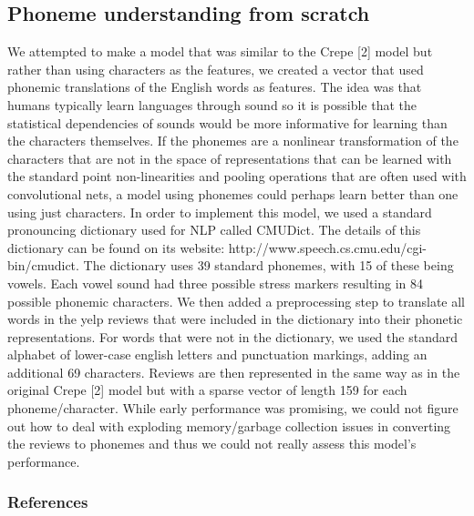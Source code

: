 \documentclass{article} %
\begin{document}
\subsection{Phoneme understanding from scratch}
We attempted to make a model that was similar to the Crepe [2] model but rather than using characters as the features, we created a vector that used phonemic translations of the English words as features. The idea was that humans typically learn languages through sound so it is possible that the statistical dependencies of sounds would be more informative for learning than the characters themselves. If the phonemes are a nonlinear transformation of the characters that are not in the space of representations that can be learned with the standard point non-linearities and pooling operations that are often used with convolutional nets, a model using phonemes could perhaps learn better than one using just characters. In order to implement this model, we used a standard pronouncing dictionary used for NLP called CMUDict. The details of this dictionary can be found on its website: http://www.speech.cs.cmu.edu/cgi-bin/cmudict. The dictionary uses 39 standard phonemes, with 15 of these being vowels. Each vowel sound had three possible stress markers resulting in 84 possible phonemic characters. We then added a preprocessing step to translate all words in the yelp reviews that were included in the dictionary into their phonetic representations. For words that were not in the dictionary, we used the standard alphabet of lower-case english letters and punctuation markings, adding an additional 69 characters. Reviews are then represented in the same way as in the original Crepe [2] model but with a sparse vector of length 159 for each phoneme/character. While early performance was promising, we could not figure out how to deal with exploding memory/garbage collection issues in converting the reviews to phonemes and thus we could not really assess this model's performance.

\subsubsection*{References}

\small{

}
\end{document}

